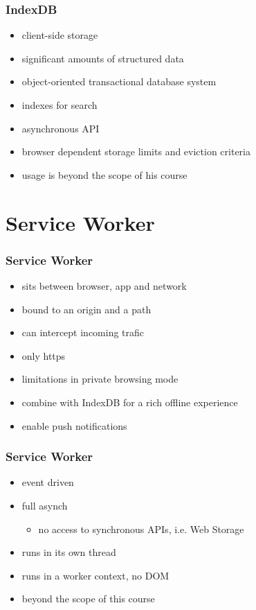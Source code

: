 \begin{frame}[fragile]\frametitle{IndexDB}
\color{structure}
\begin{itemize}\color{structure}
  \item client-side storage
  \item significant amounts of structured data
  \item object-oriented transactional database system
  \item indexes for search
  \item asynchronous API
  \item browser dependent storage limits and eviction criteria
  \item usage is beyond the scope of his course
\end{itemize}
\end{frame}

\section{Service Worker}
\begin{frame}[fragile]\frametitle{Service Worker}
\color{structure}
\begin{itemize}\color{structure}
  \item sits between browser, app and network
  \item bound to an origin and a path
  \item can intercept incoming trafic
  \item only https
  \item limitations in private browsing mode
  \item combine with IndexDB for a rich offline experience
  \item enable push notifications
\end{itemize}
\end{frame}

\begin{frame}[fragile]\frametitle{Service Worker}
\begin{itemize}\color{structure}
  \item event driven
  \item full asynch
  \begin{itemize}
    \item no access to synchronous APIs, i.e. Web Storage
  \end{itemize}
  \item runs in its own thread
  \item runs in a worker context, no DOM
  \item beyond the scope of this course
\end{itemize}
\end{frame}

